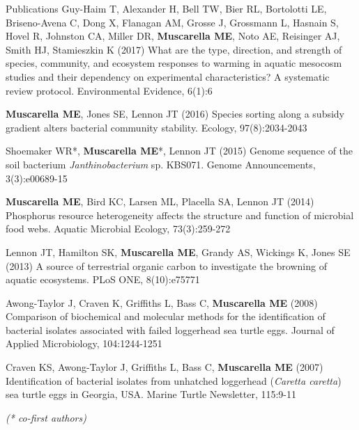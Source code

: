 \documentclass{resume} %
\begin{document}
\begin{rSection}{Publications}
Guy-Haim T, Alexander H, Bell TW, Bier RL, Bortolotti LE, Briseno-Avena C,
Dong X, Flanagan AM, Grosse J, Grossmann L, Hasnain S, Hovel R, Johnston CA,
Miller DR, {\bf Muscarella ME}, Noto AE, Reisinger AJ, Smith HJ, Stamieszkin K
(2017) What are the type, direction, and strength of species, community, and
ecosystem responses to warming in aquatic mesocosm studies and their dependency
on experimental characteristics? A systematic review protocol.
Environmental Evidence, 6(1):6

{\bf Muscarella ME}, Jones SE, Lennon JT (2016) Species sorting along a
subsidy gradient alters bacterial community stability. Ecology, 97(8):2034-2043

Shoemaker WR*, {\bf Muscarella ME}*, Lennon JT (2015) Genome sequence of the
soil bacterium {\em Janthinobacterium} sp. KBS071. Genome Announcements,
3(3):e00689-15

{\bf Muscarella ME}, Bird KC, Larsen ML, Placella SA, Lennon JT (2014)
Phosphorus resource heterogeneity affects the structure and function of
microbial food webs. Aquatic Microbial Ecology, 73(3):259-272

Lennon JT, Hamilton SK, {\bf Muscarella ME}, Grandy AS, Wickings K, Jones SE
(2013) A source of terrestrial organic carbon to investigate the browning of
aquatic ecosystems. PLoS ONE, 8(10):e75771

Awong-Taylor J, Craven K, Griffiths L, Bass C, {\bf Muscarella ME} (2008)
Comparison of biochemical and molecular methods for the identification of
bacterial isolates associated with failed loggerhead sea turtle eggs. Journal of
Applied Microbiology, 104:1244-1251

Craven KS, Awong-Taylor J, Griffiths L, Bass C, {\bf Muscarella ME} (2007)
Identification of bacterial isolates from unhatched loggerhead
({\em Caretta caretta}) sea turtle eggs in Georgia, USA.
Marine Turtle Newsletter, 115:9-11

{\em (* co-first authors)}

\end{rSection}
\end{document}
